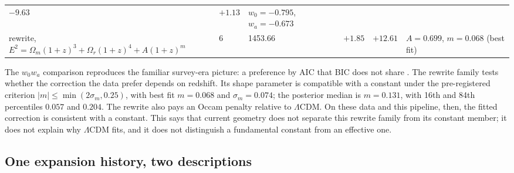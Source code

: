 \begin{longtable}[]{@{}llllll@{}}
\begin{minipage}[t]{0.10\columnwidth}
\(-9.63\)\strut
\end{minipage} & \begin{minipage}[t]{0.10\columnwidth}\raggedright
\(+1.13\)\strut
\end{minipage} & \begin{minipage}[t]{0.20\columnwidth}\raggedright
\(w_0=-0.795\), \(w_a=-0.673\)\strut
\end{minipage}\tabularnewline
\begin{minipage}[t]{0.29\columnwidth}\raggedright
rewrite, \(E^2=\Omega_m(1+z)^3+\Omega_r(1+z)^4+A(1+z)^m\)\strut
\end{minipage} & \begin{minipage}[t]{0.04\columnwidth}\raggedright
6\strut
\end{minipage} & \begin{minipage}[t]{0.11\columnwidth}\raggedright
1453.66\strut
\end{minipage} & \begin{minipage}[t]{0.10\columnwidth}\raggedright
\(+1.85\)\strut
\end{minipage} & \begin{minipage}[t]{0.10\columnwidth}\raggedright
\(+12.61\)\strut
\end{minipage} & \begin{minipage}[t]{0.20\columnwidth}\raggedright
\(A=0.699\), \(m=0.068\) (best fit)\strut
\end{minipage}\tabularnewline
\bottomrule
\end{longtable}
\addtocounter{table}{-1}

The \(w_0w_a\) comparison \citep{ChevallierPolarski2001, Linder2003}
reproduces the familiar survey-era picture: a preference by AIC that BIC
does not share \citep{Liddle2007}. The rewrite family tests whether the
correction the data prefer depends on redshift. Its shape parameter is
compatible with a constant under the pre-registered criterion
\(|m|\le\min(2\sigma_m,0.25)\), with best fit \(m=0.068\) and
\(\sigma_m=0.074\); the posterior median is \(m=0.131\), with 16th and
84th percentiles \(0.057\) and \(0.204\). The rewrite also pays an Occam
penalty relative to \(\Lambda\)CDM. On these data and this pipeline,
then, the fitted correction is consistent with a constant. This says
that current geometry does not separate this rewrite family from its
constant member; it does not explain why \(\Lambda\)CDM fits, and it
does not distinguish a fundamental constant from an effective one.

\hypertarget{one-expansion-history-two-descriptions}{%
\subsection{One expansion history, two
descriptions}\label{one-expansion-history-two-descriptions}}

